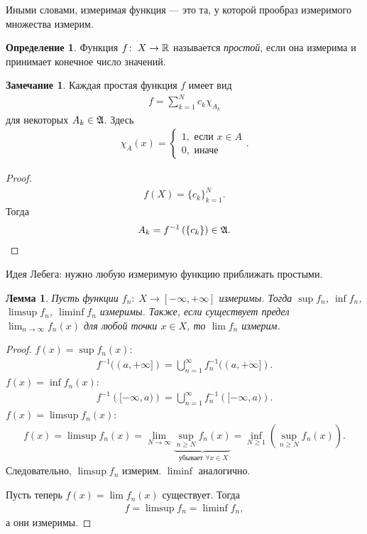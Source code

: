 \documentclass[a4paper,14pt]{extarticle}
\newcounter{theoremCnt}
\theoremstyle{definition}
\newtheorem{df}[theoremCnt]{Определение}
\theoremstyle{plain}
\theoremstyle{plain}
\newtheorem{lm}[theoremCnt]{Лемма}
\theoremstyle{plain}
\theoremstyle{plain}
\theoremstyle{definition}
\theoremstyle{definition}
\newtheorem{remrk}[theoremCnt]{Замечание}
\theoremstyle{definition}
\theoremstyle{definition}
\theoremstyle{definition}
\theoremstyle{definition}
\theoremstyle{plain}
\theoremstyle{plain}
\theoremstyle{plain}
\theoremstyle{plain}
\theoremstyle{definition}
\theoremstyle{definition}
\theoremstyle{definition}
\theoremstyle{definition}
\theoremstyle{definition}
\newcommand{\R}{\ensuremath \mathbb{R}}
\newcommand{\A}{\ensuremath \mathfrak{A}}
\begin{document}
Иными словами, измеримая функция --- это та, у которой прообраз измеримого множества измерим.
\begin{df}
 Функция $f \colon\; X \to \R$ называется \textit{простой}, если она измерима и принимает конечное число значений.
\end{df}
\begin{remrk}
 Каждая простая функция $f$ имеет вид
 \begin{align*}
  f = \sum_{k=1}^{N} c_k \chi_{A_k}
 \end{align*} для некоторых $A_k \in \A$. Здесь
 \begin{align*}
  \chi_A(x) = \begin{cases}
   1, \text{ если } x \in A \\
   0, \text{ иначе }
  \end{cases}
 .\end{align*}
\end{remrk}
\begin{proof}
 \begin{align*}
  f(X) = \{c_{k}\}_{k=1}^{N}
 .\end{align*} Тогда
 \begin{align*}
  A_k = f^{-1} \left( \left\{ c_k \right\} \right) \in \A
 .\end{align*}
\end{proof}
Идея Лебега: нужно любую измеримую функцию приближать простыми.
\begin{lm}
 Пусть функции $f_n \colon\; X \to [-\infty, +\infty]$ измеримы. Тогда $\sup f_n$, $\inf f_n$,  $\limsup f_n$, $\liminf f_n$ измеримы. Также, если существует предел  $\lim_{n \to \infty} f_n(x)$ для любой точки $x \in X$, то $\lim f_n$ измерим.
\end{lm}
\begin{proof}
 $f(x) = \sup f_n(x)$:
 \begin{align*}
  f^{-1}((a, +\infty]) = \bigcup_{n=1}^{\infty} f^{-1}_n( (a, +\infty] )
 .\end{align*} $f(x) = \inf f_n(x)$:
 \begin{align*}
  f^{-1} \left( [-\infty, a) \right) = \bigcup_{n=1}^{\infty} f^{-1}_n \left( [-\infty, a) \right)
 .\end{align*}  $f(x) = \limsup f_n(x)$:
 \begin{align*}
  f(x) = \limsup f_n(x) = \displaystyle\lim_{N \to \infty} \underbrace{\sup_{n \geqslant N} f_n(x)}_{\text{ убывает } \forall x \in X} = \inf_{N \geqslant 1} \left( \sup_{n \geqslant N} f_n(x) \right)
 .\end{align*} Следовательно, $\limsup f_n$ измерим. $\liminf$ аналогично.

 Пусть теперь $f(x) = \lim f_n(x)$ существует. Тогда
 \begin{align*}
  f = \limsup f_n = \liminf f_n
 ,\end{align*} а они измеримы.
\end{proof}
\end{document}
